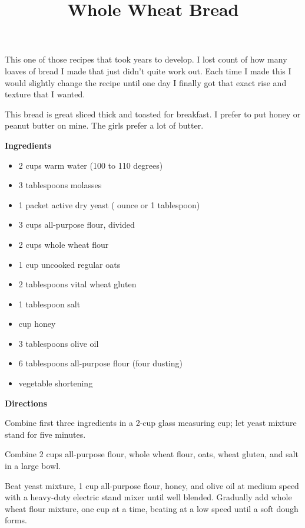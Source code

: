 \documentclass{article}
\title{Whole Wheat Bread}
\begin{document}
This one of those recipes that took years to develop. I lost count of how many
loaves of bread I made that just didn't quite work out. Each time I made this I
would slightly change the recipe until one day I finally got that exact rise
and texture that I wanted.

This bread is great sliced thick and toasted for breakfast. I prefer to put honey
or peanut butter on mine. The girls prefer a lot of butter.

\bigskip

\bigskip

\textbf{Ingredients}
\begin{multicols}{2}
      \begin{itemize}
            \item 2 cups warm water (100 to 110 degrees)
            \item 3 tablespoons molasses
            \item 1 packet active dry yeast ( ounce or 1 tablespoon)
            \item 3 cups all-purpose flour, divided
            \item 2 cups whole wheat flour
            \item 1 cup uncooked regular oats
            \item 2 tablespoons vital wheat gluten
            \item 1 tablespoon salt
            \item {} cup honey
            \item 3 tablespoons olive oil
            \item 6 tablespoons all-purpose flour (four dusting)
            \item vegetable shortening
      \end{itemize}
\end{multicols}

\textbf{Directions}

Combine first three ingredients in a 2-cup glass measuring cup; let yeast
mixture stand for five minutes.

Combine 2 cups all-purpose flour, whole wheat flour, oats, wheat gluten, and salt in a large bowl.

Beat yeast mixture, 1 cup all-purpose flour, honey, and olive oil at medium speed with
a heavy-duty electric stand mixer until well blended. Gradually add whole wheat flour
mixture, one cup at a time, beating at a low speed until a soft dough forms.
\end{document}

